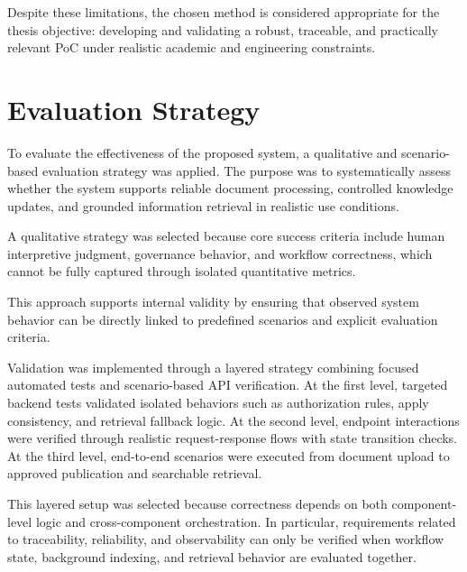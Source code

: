 \vspace{0.3cm}

Despite these limitations, the chosen method is considered appropriate for the thesis objective: developing and validating a robust, traceable, and practically relevant PoC under realistic academic and engineering constraints.

\section{Evaluation Strategy}

To evaluate the effectiveness of the proposed system, a qualitative and scenario-based evaluation strategy was applied.
The purpose was to systematically assess whether the system supports reliable document processing, controlled knowledge updates, and grounded information retrieval in realistic use conditions.

A qualitative strategy was selected because core success criteria include human interpretive judgment, governance behavior, and workflow correctness, which cannot be fully captured through isolated quantitative metrics.

\vspace{0.4cm}

This approach supports internal validity by ensuring that observed system behavior can be directly linked to predefined scenarios and explicit evaluation criteria.

\vspace{0.4cm}

Validation was implemented through a layered strategy combining focused automated tests and scenario-based API verification.
At the first level, targeted backend tests validated isolated behaviors such as authorization rules, apply consistency, and retrieval fallback logic.
At the second level, endpoint interactions were verified through realistic request-response flows with state transition checks.
At the third level, end-to-end scenarios were executed from document upload to approved publication and searchable retrieval.

\vspace{0.4cm}

This layered setup was selected because correctness depends on both component-level logic and cross-component orchestration.
In particular, requirements related to traceability, reliability, and observability can only be verified when workflow state, background indexing, and retrieval behavior are evaluated together.

